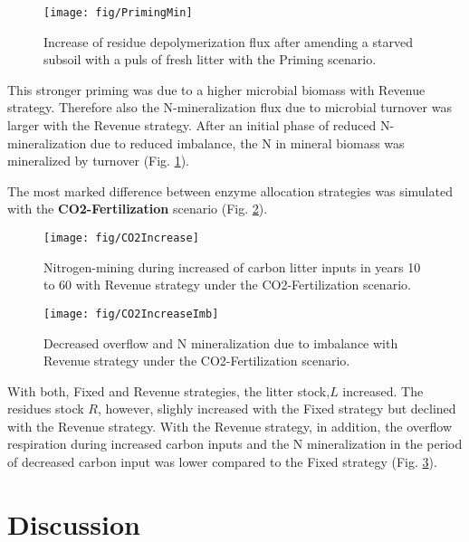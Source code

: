 \begin{figure}[t]
\vspace*{2mm}
\begin{center}
\texttt{[image: fig/PrimingMin]}
\end{center}
\caption{Increase of residue depolymerization flux after amending a starved
subsoil with a puls of fresh litter with the Priming scenario.
\label{fig:PrimingMin}}
\end{figure}

This stronger priming was due to a higher microbial biomass with Revenue
strategy. Therefore also the N-mineralization flux due to microbial turnover
was larger with the Revenue strategy. After an initial phase of reduced
N-mineralization due to reduced imbalance, the N in mineral biomass was
mineralized by turnover (Fig. \ref{fig:PrimingMin}).

The most marked difference between enzyme allocation strategies was simulated
with the \textbf{CO2-Fertilization} scenario (Fig. \ref{fig:CO2Increase}).
\begin{figure}[t]
\vspace*{2mm}
\begin{center}
\texttt{[image: fig/CO2Increase]}
\end{center}
\caption{Nitrogen-mining during increased of carbon litter inputs in years 10
to 60 with Revenue strategy under the CO2-Fertilization scenario.
\label{fig:CO2Increase}}
\end{figure}
\begin{figure}[t] \vspace*{2mm}
\begin{center}
\texttt{[image: fig/CO2IncreaseImb]}
\end{center}
\caption{Decreased overflow and N mineralization due to imbalance with Revenue 
strategy under the CO2-Fertilization scenario.
\label{fig:CO2IncreaseImb}}
\end{figure}
With both, Fixed and Revenue strategies, the litter stock,$L$ increased. The
residues stock $R$, however, slighly increased with the Fixed strategy but
declined with the Revenue strategy. With the Revenue strategy, in addition, the
overflow respiration during increased carbon inputs and the N mineralization
in the period of decreased carbon input was lower compared to the Fixed
strategy (Fig. \ref{fig:CO2IncreaseImb}).


\section{Discussion}
